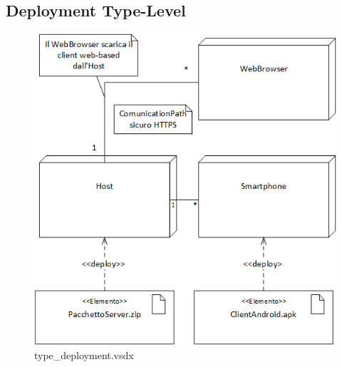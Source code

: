 \documentclass[a4paper]{article}
\begin{document}
\newpage


\subsection{Deployment Type-Level}

\begin{figure}[H]
    \includegraphics[scale=1]{Implementazione/type_deployment.png}
    \centering
    \caption{type\_deployment.vsdx}
\end{figure}
\end{document}
